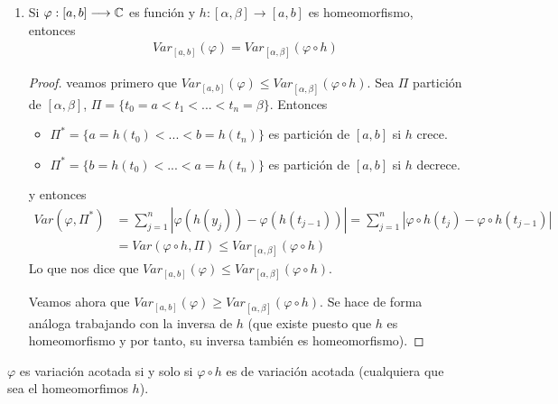 \begin{obs}
\begin{enumerate}
\begin{proof}
\begin{align*}
                                    & \leq \sum_{k=1}^{m}{|\varphi(s_k) - \varphi(s_{k-1})|} = Var(\varphi, P) \leq Var_{[a,b]}(\varphi)
                  \end{align*}
                  $b)$ Se deja como ejercicio.
              \end{proof}
        \item Si $\varphi : [a,b] \longrightarrow \mathbb{C}$ es función y $h : [\alpha,\beta] \longrightarrow [a,b]$ es homeomorfismo, entonces
              \begin{align*}
                  Var_{[a,b]}(\varphi) = Var_{[\alpha,\beta]}(\varphi \circ h)
              \end{align*}
              \begin{proof}
                  veamos primero que $Var_{[a,b]}(\varphi) \leq Var_{[\alpha,\beta]}(\varphi \circ h)$.
                  Sea $\Pi$ partición de $[\alpha,\beta]$, $\Pi = \{t_0 = a < t_1 < ... < t_n = \beta\}$. Entonces
                  \begin{itemize}
                      \item $\Pi^* = \{ a = h(t_0) < ... < b = h(t_n) \}$ es partición de $[a,b]$ si $h$ crece.
                      \item $\Pi^* = \{ b = h(t_0) < ... < a = h(t_n) \}$ es partición de $[a,b]$ si $h$ decrece.
                  \end{itemize}
                  y entonces
                  \begin{align*}
                      Var(\varphi,\Pi^*) & = \sum_{j=1}^{n}{|\varphi(h(y_j)) - \varphi(h(t_{j-1}))|} = \sum_{j=1}^{n}{|\varphi \circ h (t_j) - \varphi \circ h (t_{j-1})|} \\
                                         & = Var(\varphi \circ h, \Pi) \leq Var_{[\alpha,\beta]}(\varphi \circ h)
                  \end{align*}
                  Lo que nos dice que $Var_{[a,b]}(\varphi) \leq Var_{[\alpha,\beta]}(\varphi \circ h)$.

                  Veamos ahora que $Var_{[a,b]}(\varphi) \ge Var_{[\alpha,\beta]}(\varphi \circ h)$. Se hace de forma análoga trabajando con la inversa de $h$ (que existe puesto que $h$ es homeomorfismo y por tanto, su inversa también es homeomorfismo).
              \end{proof}
    \end{enumerate}
\end{obs}

\begin{cor}
    $\varphi$ es variación acotada si y solo si $\varphi \circ h$ es de variación acotada (cualquiera que sea el homeomorfimos $h$).
\end{cor}

